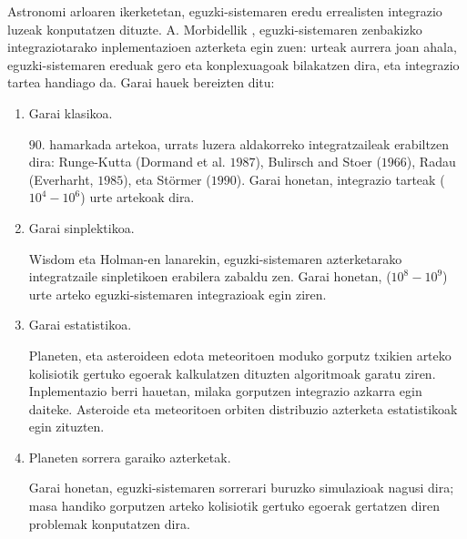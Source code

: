 Astronomi arloaren ikerketetan, eguzki-sistemaren eredu errealisten integrazio luzeak konputatzen dituzte. A. Morbidellik \cite{Morbidelli2002}, eguzki-sistemaren zenbakizko integraziotarako inplementazioen azterketa egin zuen: urteak aurrera joan ahala, eguzki-sistemaren ereduak gero eta konplexuagoak bilakatzen dira, eta integrazio tartea handiago da. Garai hauek bereizten ditu:
\begin{enumerate}

\item Garai klasikoa.

$90$. hamarkada artekoa, urrats luzera aldakorreko integratzaileak erabiltzen dira: Runge-Kutta (Dormand et al. $1987$), Bulirsch and Stoer ($1966$), Radau (Everharht, $1985$), eta Störmer ($1990$). Garai honetan, integrazio tarteak ($10^4-10^6$) urte artekoak dira.  

\item Garai sinplektikoa.

Wisdom eta Holman-en \cite[1991]{Sussman1992} lanarekin, eguzki-sistemaren azterketarako integratzaile sinpletikoen erabilera zabaldu zen. Garai honetan, ($10^8-10^9$) urte arteko eguzki-sistemaren integrazioak egin ziren.  

\item Garai estatistikoa.

Planeten, eta asteroideen edota meteoritoen moduko gorputz txikien  arteko kolisiotik gertuko egoerak kalkulatzen dituzten algoritmoak garatu ziren. Inplementazio berri hauetan, milaka gorputzen integrazio azkarra egin daiteke. Asteroide eta meteoritoen orbiten distribuzio azterketa estatistikoak egin zituzten.

\item Planeten sorrera garaiko azterketak.

Garai honetan, eguzki-sistemaren sorrerari buruzko simulazioak nagusi dira; masa handiko gorputzen arteko kolisiotik gertuko egoerak gertatzen diren problemak konputatzen dira. 
 
\end{enumerate}

